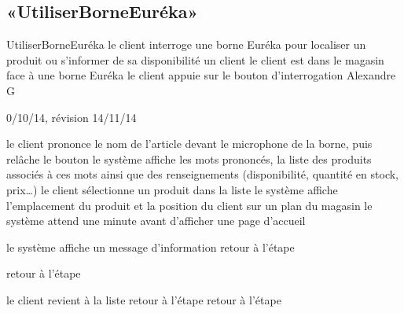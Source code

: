 \subsection[SS:CUD:UBE]{«UtiliserBorneEuréka»}

\startCU
\nom UtiliserBorneEuréka
\but le client interroge une borne Euréka pour localiser un produit ou s’informer de sa disponibilité
\acteur un client
\precondition le client est dans le magasin face à une borne Euréka
\declenchement le client appuie sur le bouton d'interrogation
\auteur Alexandre G
\date 30/10/14, révision 14/11/14

\nominal %
\startnominal
{} le client prononce le nom de l'article devant le microphone de la borne, puis relâche le bouton
 le système affiche les mots prononcés, la liste des produits associés à ces mots ainsi que des renseignements (disponibilité, quantité en stock, prix\dots) 
 le client sélectionne un produit dans la liste
\etape le système affiche l'emplacement du produit et la position du client sur un plan du magasin
 le système attend une minute avant d'afficher une page d'accueil
\stopnominal

\alternatifs 

  \etape le système affiche un message d'information
  \etape retour à l'étape 
\stopcondition
\stopalternatif

\etape retour à l'étape 
\stopcondition
\stopalternatif

  \etape le client revient à la liste 
  \etape retour à l'étape 
\stopcondition
{}
  \etape retour à l'étape 
\stopcondition
\stopalternatif

\stopCU
